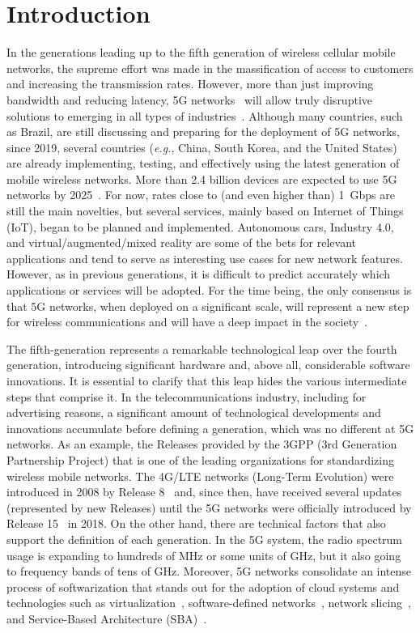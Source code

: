 \section{Introduction}\label{sec:introducao}

In the generations leading up to the fifth generation of wireless cellular mobile networks, the supreme effort was made in the massification of access to customers and increasing the transmission rates. However, more than just improving bandwidth and reducing latency, 5G networks~\cite{shafi:17} will allow truly disruptive solutions to emerging in all types of industries~\cite{kaloxylos:18}. Although many countries, such as Brazil, are still discussing and preparing for the deployment of 5G networks, since 2019, several countries (\textit{e.g.}, China, South Korea, and the United States) are already implementing, testing, and effectively using the latest generation of mobile wireless networks. More than 2.4 billion devices are expected to use 5G networks by 2025~\cite{richter:19}. For now, rates close to (and even higher than) 1~Gbps are still the main novelties, but several services, mainly based on Internet of Things (IoT), began to be planned and implemented. Autonomous cars, Industry 4.0, and virtual/augmented/mixed reality are some of the bets for relevant applications and tend to serve as interesting use cases for new network features. However, as in previous generations, it is difficult to predict accurately which applications or services will be adopted. For the time being, the only consensus is that 5G networks, when deployed on a significant scale, will represent a new step for wireless communications and will have a deep impact in the society~\cite{wef:20}.

The fifth-generation represents a remarkable technological leap over the fourth generation, introducing significant hardware and, above all, considerable software innovations. It is essential to clarify that this leap hides the various intermediate steps that comprise it. In the telecommunications industry, including for advertising reasons, a significant amount of technological developments and innovations accumulate before defining a generation, which was no different at 5G networks. As an example, the Releases provided by the 3GPP (3rd Generation Partnership Project) that is one of the leading organizations for standardizing wireless mobile networks. The 4G/LTE networks (Long-Term Evolution) were introduced in 2008 by Release 8~\cite{3GPP-rel08:19} and, since then, have received several updates (represented by new Releases) until the 5G networks were officially introduced by Release 15~\cite {3gpp:rel15nr21.915} in 2018. On the other hand, there are technical factors that also support the definition of each generation. In the 5G system, the radio spectrum usage is expanding to hundreds of MHz or some units of GHz, but it also going to frequency bands of tens of GHz. Moreover, 5G networks consolidate an intense process of softwarization that stands out for the adoption of cloud systems and technologies such as virtualization~\cite{abdelwahab:16}, software-defined networks~\cite{chen:15}, network slicing~\cite{foukas2017network}, and Service-Based Architecture (SBA)~\cite{mademann:18}.

